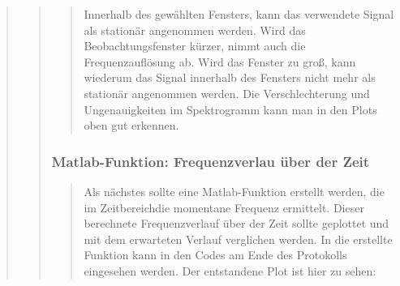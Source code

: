 \begin{quote}
\begin{quote}
\begin{quote}
                \vspace{1.5em}
        
        Innerhalb des gewählten Fensters, kann das verwendete Signal als
        stationär angenommen werden. Wird das Beobachtungsfenster kürzer, nimmt
        auch die Frequenzauflösung ab. Wird das Fenster zu groß, kann wiederum
        das Signal innerhalb des Fensters nicht mehr als stationär angenommen
        werden. Die Verschlechterung und Ungenauigkeiten im Spektrogramm kann
        man in den Plots oben gut erkennen.
        
        \end{quote}%
        
        \subsubsection{Matlab-Funktion: Frequenzverlau über der Zeit}
        \begin{quote}
        
        Als nächstes sollte eine Matlab-Funktion erstellt werden, die im
        Zeitbereichdie momentane Frequenz ermittelt. Dieser berechnete
        Frequenzverlauf über der Zeit sollte geplottet und mit dem erwarteten
        Verlauf verglichen werden. In die erstellte Funktion kann in den Codes am
        Ende des Protokolls eingesehen werden. Der entstandene Plot ist hier zu
        sehen:
        

\end{quote}
\end{quote}
\end{quote}
